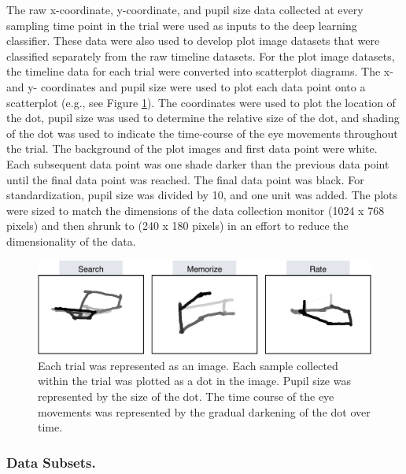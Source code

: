 \documentclass[
  english,
  man, donotrepeattitle,floatsintext]{apa6}
\begin{document}
The raw x-coordinate, y-coordinate, and pupil size data collected at every sampling time point in the trial were used as inputs to the deep learning classifier. These data were also used to develop plot image datasets that were classified separately from the raw timeline datasets. For the plot image datasets, the timeline data for each trial were converted into scatterplot diagrams. The x- and y- coordinates and pupil size were used to plot each data point onto a scatterplot (e.g., see Figure \ref{fig:ave-condition}). The coordinates were used to plot the location of the dot, pupil size was used to determine the relative size of the dot, and shading of the dot was used to indicate the time-course of the eye movements throughout the trial. The background of the plot images and first data point were white. Each subsequent data point was one shade darker than the previous data point until the final data point was reached. The final data point was black. For standardization, pupil size was divided by 10, and one unit was added. The plots were sized to match the dimensions of the data collection monitor (1024 x 768 pixels) and then shrunk to (240 x 180 pixels) in an effort to reduce the dimensionality of the data.

\begin{figure}
\includegraphics[width=6.59in]{figures/cond_imgs} \caption{Each trial was represented as an image. Each sample collected within the trial was plotted as a dot in the image. Pupil size was represented by the size of the dot. The time course of the eye movements was represented by the gradual darkening of the dot over time.}\label{fig:ave-condition}
\end{figure}

\subsubsection{Data Subsets.}
\end{document}
